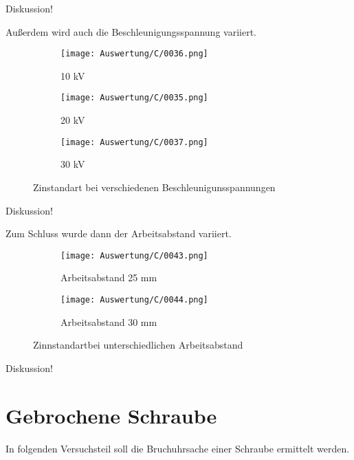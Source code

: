 Diskussion!

Außerdem wird auch die Beschleunigungsspannung variiert.
\begin{figure}[h]
    \centering
    \begin{subfigure}[b]{0.25\textwidth}
        \centering
        \texttt{[image: Auswertung/C/0036.png]}
        \caption{10 kV}
    \end{subfigure}
    \hfill
    \begin{subfigure}[b]{0.25\textwidth}
        \centering
        \texttt{[image: Auswertung/C/0035.png]}
        \caption{20 kV}
    \end{subfigure}
    \hfill
    \begin{subfigure}[b]{0.25\textwidth}
        \centering
        \texttt{[image: Auswertung/C/0037.png]}
        \caption{30 kV}
    \end{subfigure}
    \caption{Zinstandart bei verschiedenen Beschleunigunsspannungen}
\end{figure}

Diskussion!

\newpage
Zum Schluss wurde dann der Arbeitsabstand variiert.
\begin{figure}[h]
    \centering
    
    \begin{subfigure}[b]{0.45\textwidth}
        \centering
        \texttt{[image: Auswertung/C/0043.png]}
        \caption{Arbeitsabstand 25 mm}
    \end{subfigure}
    \hfill
    \begin{subfigure}[b]{0.45\textwidth}
        \centering
        \texttt{[image: Auswertung/C/0044.png]}
        \caption{Arbeitsabstand 30 mm}
    \end{subfigure}
    
    \caption{Zinnstandartbei unterschiedlichen Arbeitsabstand}
\end{figure}

Diskussion!

\newpage
\section{Gebrochene Schraube}

In folgenden Versuchsteil soll die Bruchuhrsache einer Schraube ermittelt werden.

